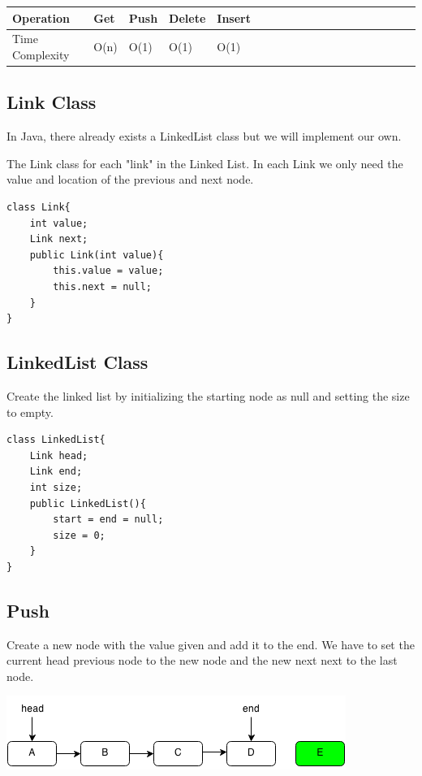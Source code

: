 \documentclass[11pt,oneside]{book}
\makeatletter
\def\maxwidth#1{\ifdim\Gin@nat@width>#1 #1\else\Gin@nat@width\fi}
\makeatother
\begin{document}
\vspace{10pt} \begin{tabulary}{0.4\linewidth}{|l|l|l|l|l|l|l|l|l|l|l|l|l|l|l|l|l|l|l}\hline


  Operation &
  Get &
  Push &
  Delete &
  Insert\\
\hline


  Time Complexity &
  O(n) &
  O(1) &
  O(1) &
  O(1)\\

\hline\end{tabulary}

\subsection{Link Class}

In Java, there already exists a LinkedList class but we will implement our own.

The Link class for each "link" in the Linked List. In each Link we only need the value and location of the previous and next node.

\begin{lstlisting}
class Link{
    int value;
    Link next;
    public Link(int value){
        this.value = value;
        this.next = null;
    }
}
\end{lstlisting}

\subsection{LinkedList Class}

Create the linked list by initializing the starting node as null and setting the size to empty.

\begin{lstlisting}
class LinkedList{
    Link head;
    Link end;
    int size;
    public LinkedList(){
        start = end = null;
        size = 0;
    }
}
\end{lstlisting}

\subsection{Push}

Create a new node with the value given and add it to the end. We have to set the current head previous node to the new node and the new next next to the last node.

\includegraphics[width=\maxwidth{\textwidth}]{linkedlistpush.png}
\end{document}
